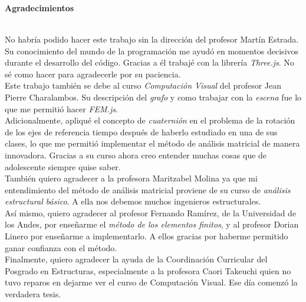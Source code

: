 \newpage{\pagestyle{empty}\cleardoublepage}

\newpage
\thispagestyle{empty} \textbf{}\normalsize
\\\\\\%
\textbf{\LARGE Agradecimientos}
\\ %

No habría podido hacer este trabajo sin la dirección del profesor Martín Estrada. Su conocimiento del mundo de la programación me ayudó en momentos decisivos durante el desarrollo del código. Gracias a él trabajé con la librería \emph{Three.js}. No sé como hacer para agradecerle por su paciencia.\\

Este trabajo también se debe al curso \emph{Computación Visual} del profesor Jean Pierre Charalambos. Su descripción del \emph{grafo} y como trabajar con la \emph{escena} fue lo que me permitió hacer \emph{FEM.js}.\\

Adicionalmente, apliqué el concepto de \emph{cuaternión} en el problema de la rotación de los ejes de referencia tiempo después de haberlo estudiado en una de sus clases, lo que me permitió implementar el método de análisis matricial de manera innovadora. Gracias a su curso ahora creo entender muchas cosas que de adolescente siempre quise saber.\\

También quiero agradecer a la profesora Maritzabel Molina ya que mi entendimiento del método de análisis matricial proviene de su curso de \emph{análisis estructural básico}. A ella nos debemos muchos ingenieros estructurales.\\

Así mismo, quiero agradecer al profesor Fernando Ramírez, de la Universidad de los Andes, por enseñarme el \emph{método de los elementos finitos}, y al profesor Dorian Linero por enseñarme a implementarlo. A ellos gracias por haberme permitido ganar confianza con el método.\\

Finalmente, quiero agradecer la ayuda de la Coordinación Curricular del Posgrado en Estructuras, especialmente a la profesora Caori Takeuchi quien no tuvo reparos en dejarme ver el curso de Computación Visual. Ese día comenzó la verdadera tesis.\\


\newpage{\pagestyle{empty}\cleardoublepage}

